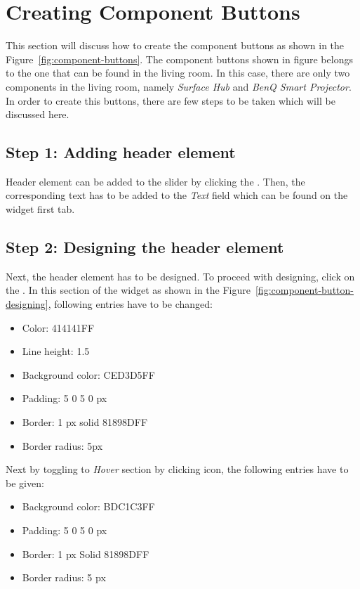 \section{Creating Component Buttons}
This section will discuss how to create the component buttons as shown in the Figure~\ref{fig:component-buttons}. The component buttons shown in figure belongs to the one that can be found in the living room. In this case, there are only two components in the living room, namely \emph{Surface Hub} and \emph{BenQ Smart Projector}. In order to create this buttons, there are few steps to be taken which will be discussed here.

\subsection*{Step 1: Adding header element}
Header element can be added to the slider by clicking the . Then, the corresponding text has to be added to the \emph{Text} field which can be found on the widget first tab.

\subsection*{Step 2: Designing the header element}
Next, the header element has to be designed. To proceed with designing, click on the . In this section of the widget as shown in the Figure~\ref{fig:component-button-designing}, following entries have to be changed:
\begin{itemize}
\item Color: 414141FF
\item Line height: 1.5
\item Background color: CED3D5FF
\item Padding: 5 0 5 0 px
\item Border: 1 px solid 81898DFF
\item Border radius: 5px
\end{itemize}

Next by toggling to \emph{Hover} section by clicking  icon, the following entries have to be given:
\begin{itemize}
\item Background color: BDC1C3FF
\item Padding: 5 0 5 0 px
\item Border: 1 px Solid 81898DFF
\item Border radius: 5 px
\end{itemize}

